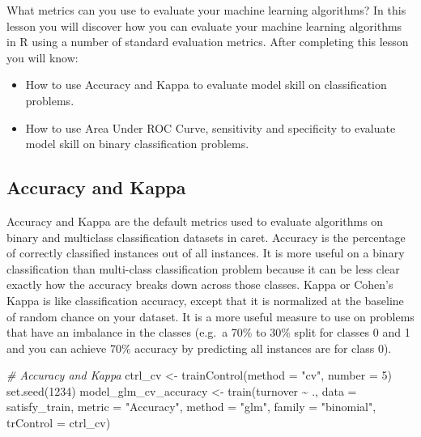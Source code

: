 \documentclass[
]{book}
\newenvironment{Shaded}{\begin{snugshade}}{\end{snugshade}}
\newcommand{\AttributeTok}[1]{\textcolor[rgb]{0.77,0.63,0.00}{#1}}
\newcommand{\CommentTok}[1]{\textcolor[rgb]{0.56,0.35,0.01}{\textit{#1}}}
\newcommand{\DecValTok}[1]{\textcolor[rgb]{0.00,0.00,0.81}{#1}}
\newcommand{\FunctionTok}[1]{\textcolor[rgb]{0.00,0.00,0.00}{#1}}
\newcommand{\NormalTok}[1]{#1}
\newcommand{\OtherTok}[1]{\textcolor[rgb]{0.56,0.35,0.01}{#1}}
\newcommand{\SpecialCharTok}[1]{\textcolor[rgb]{0.00,0.00,0.00}{#1}}
\newcommand{\StringTok}[1]{\textcolor[rgb]{0.31,0.60,0.02}{#1}}
\providecommand{\tightlist}{%
  \setlength{\itemsep}{0pt}\setlength{\parskip}{0pt}}
\begin{document}
What metrics can you use to evaluate your machine learning algorithms? In this lesson you will discover how you can evaluate your machine learning algorithms in R using a number of standard evaluation metrics. After completing this lesson you will know:

\begin{itemize}
\tightlist
\item
  How to use Accuracy and Kappa to evaluate model skill on classification problems.
\item
  How to use Area Under ROC Curve, sensitivity and specificity to evaluate model skill on binary classification problems.
\end{itemize}

\hypertarget{accuracy-and-kappa-1}{%
\subsection{Accuracy and Kappa}\label{accuracy-and-kappa-1}}

Accuracy and Kappa are the default metrics used to evaluate algorithms on binary and multiclass classification datasets in caret. Accuracy is the percentage of correctly classified instances out of all instances. It is more useful on a binary classification than multi-class classification problem because it can be less clear exactly how the accuracy breaks down across those classes.
Kappa or Cohen's Kappa is like classification accuracy, except that it is normalized at the baseline of random chance on your dataset. It is a more useful measure to use on problems that have an imbalance in the classes (e.g.~a 70\% to 30\% split for classes 0 and 1 and you can
achieve 70\% accuracy by predicting all instances are for class 0).

\begin{Shaded}
\begin{Highlighting}[]
\CommentTok{\# Accuracy and Kappa}
\NormalTok{ctrl\_cv }\OtherTok{\textless{}{-}} \FunctionTok{trainControl}\NormalTok{(}\AttributeTok{method =} \StringTok{"cv"}\NormalTok{, }\AttributeTok{number =} \DecValTok{5}\NormalTok{)}
\FunctionTok{set.seed}\NormalTok{(}\DecValTok{1234}\NormalTok{)}
\NormalTok{model\_glm\_cv\_accuracy }\OtherTok{\textless{}{-}} \FunctionTok{train}\NormalTok{(turnover }\SpecialCharTok{\textasciitilde{}}\NormalTok{ .,}
                        \AttributeTok{data =}\NormalTok{ satisfy\_train,}
                        \AttributeTok{metric =} \StringTok{"Accuracy"}\NormalTok{,}
                        \AttributeTok{method =} \StringTok{"glm"}\NormalTok{, }\AttributeTok{family =} \StringTok{"binomial"}\NormalTok{,}
                        \AttributeTok{trControl =}\NormalTok{ ctrl\_cv)}
\end{Highlighting}
\end{Shaded}
\end{document}
